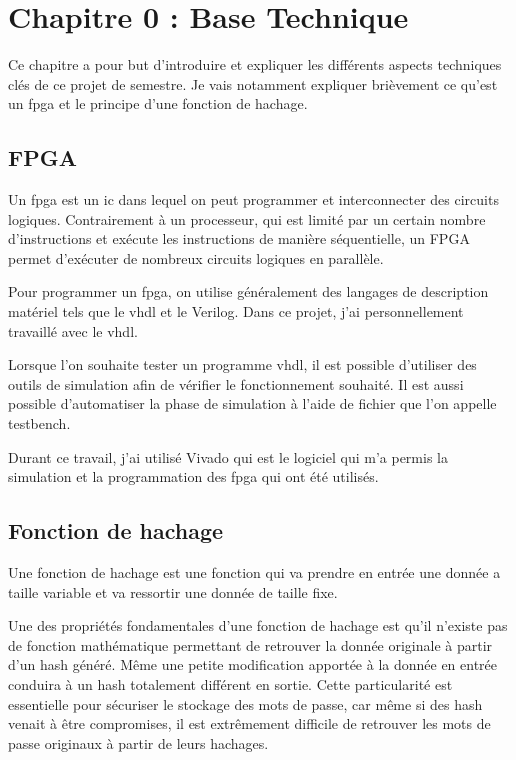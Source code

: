 \chapter{Chapitre 0 : Base Technique}

Ce chapitre a pour but d'introduire et expliquer les différents aspects techniques clés de ce projet de semestre. Je vais notamment expliquer brièvement ce qu'est un \gls{fpga} et le principe d'une fonction de hachage.

\section{FPGA}
Un \gls{fpga} est un \gls{ic} dans lequel on peut programmer et interconnecter des circuits logiques. Contrairement à un processeur, qui est limité par un certain nombre d'instructions et exécute les instructions de manière séquentielle, un FPGA permet d'exécuter de nombreux circuits logiques en parallèle.

Pour programmer un \gls{fpga}, on utilise généralement des langages de description matériel tels que le \gls{vhdl} et le Verilog. Dans ce projet, j'ai personnellement travaillé avec le \gls{vhdl}.

Lorsque l'on souhaite tester un programme \gls{vhdl}, il est possible d'utiliser des outils de simulation afin de vérifier le fonctionnement souhaité. Il est aussi possible d'automatiser la phase de simulation à l'aide de fichier que l'on appelle testbench.

Durant ce travail, j'ai utilisé Vivado qui est le logiciel qui m'a permis la simulation et la programmation des \gls{fpga} qui ont été utilisés. 
\section{Fonction de hachage}

Une fonction de hachage est une fonction qui va prendre en entrée une donnée a taille variable et va ressortir une donnée de taille fixe. 

Une des propriétés fondamentales d'une fonction de hachage est qu'il n'existe pas de fonction mathématique permettant de retrouver la donnée originale à partir d'un hash généré. 
Même une petite modification apportée à la donnée en entrée conduira à un hash totalement différent en sortie. 
Cette particularité est essentielle pour sécuriser le stockage des mots de passe, car même si des hash venait à être compromises, il est extrêmement difficile de retrouver les mots de passe originaux à partir de leurs hachages.


